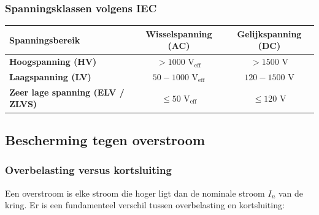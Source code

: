 \documentclass[a4paper,11pt]{article}
\begin{document}
\subsubsection{Spanningsklassen volgens IEC}

\begin{center}
    \begin{tabular}{@{}lcc@{}}
        \toprule
        \textbf{Spanningsbereik}                 & \textbf{Wisselspanning (AC)}      & \textbf{Gelijkspanning (DC)} \\
        \midrule
        \textbf{Hoogspanning (HV)}               & $> 1000\text{ V}_{\text{eff}}$    & $> 1500\text{ V}$            \\
        \textbf{Laagspanning (LV)}               & $50 - 1000\text{ V}_{\text{eff}}$ & $120 - 1500\text{ V}$        \\
        \textbf{Zeer lage spanning (ELV / ZLVS)} & $\le 50\text{ V}_{\text{eff}}$    & $\le 120\text{ V}$           \\
        \bottomrule
    \end{tabular}
\end{center}

\subsection{Bescherming tegen overstroom}

\subsubsection{Overbelasting versus kortsluiting}\label{sec:overstroom}

Een overstroom is elke stroom die hoger ligt dan de nominale stroom $I_n$ van de kring. Er is een
fundamenteel verschil tussen overbelasting en kortsluiting:
\end{document}
